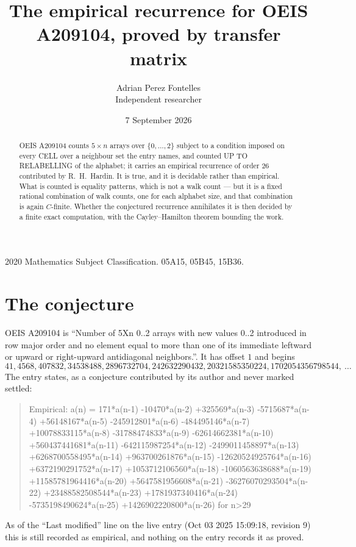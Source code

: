 \documentclass[11pt,a4paper]{article}
\title{The empirical recurrence for OEIS A209104, proved by transfer matrix}
\author{Adrian Perez Fontelles\\ \small Independent researcher}
\date{7 September 2026}
\theoremstyle{plain}
\theoremstyle{definition}
\begin{document}
\maketitle

\begin{abstract}
OEIS A209104 counts $5\times n$ arrays over $\{0,\dots,2\}$ subject to a condition imposed on
every CELL over a neighbour set the entry names, and counted UP TO RELABELLING of the
alphabet; it carries an empirical recurrence of order $26$ contributed by
R.~H.~Hardin. It is true, and it is decidable rather than empirical. What is counted is
equality patterns, which is not a walk count --- but it is a fixed rational combination of
walk counts, one for each alphabet size, and that combination is again $C$-finite. Whether the
conjectured recurrence annihilates it is then decided by a finite exact computation, with the
Cayley--Hamilton theorem bounding the work.
\end{abstract}

\noindent\small 2020 Mathematics Subject Classification. 05A15, 05B45, 15B36.\normalsize

\section{The conjecture}

OEIS A209104 is ``Number of 5Xn 0..2 arrays with new values 0..2 introduced in row major order and no element equal to more than one of its immediate leftward or upward or right-upward antidiagonal neighbors.''. It has offset $1$ and begins
\[
41, 4568, 407832, 34538488, 2896732704, 242632290432, 20321585350224, 1702054356798544,\ \dots
\]
The entry states, as a conjecture contributed by its author and never marked settled:
\begin{quote}
Empirical: a(n) = 171*a(n-1) -10470*a(n-2) +325569*a(n-3) -5715687*a(n-4) +56148167*a(n-5) -245912801*a(n-6) -484495146*a(n-7) +10078833115*a(n-8) -31788474833*a(n-9) -62614662381*a(n-10) +560437441681*a(n-11) -642115987254*a(n-12) -2499011458897*a(n-13) +6268700558495*a(n-14) +963700261876*a(n-15) -12620524925764*a(n-16) +6372190291752*a(n-17) +1053712106560*a(n-18) -1060563638688*a(n-19) +11585781964416*a(n-20) +5647581956608*a(n-21) -36276070293504*a(n-22) +23488582508544*a(n-23) +1781937340416*a(n-24) -5735198490624*a(n-25) +1426902220800*a(n-26) for n>29
\end{quote}
As of the ``Last modified'' line on the live entry (Oct 03 2025 15:09:18, revision 9) this is still
recorded as empirical, and nothing on the entry records it as proved.
\end{document}
